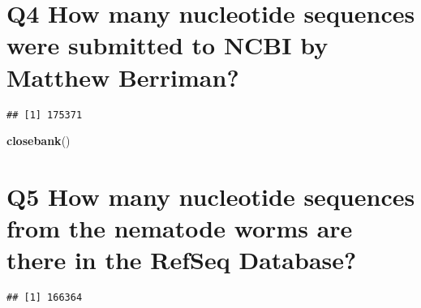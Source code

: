 \documentclass[]{article}
\newenvironment{Shaded}{\begin{snugshade}}{\end{snugshade}}
\newcommand{\KeywordTok}[1]{\textcolor[rgb]{0.13,0.29,0.53}{\textbf{#1}}}
\newcommand{\StringTok}[1]{\textcolor[rgb]{0.31,0.60,0.02}{#1}}
\newcommand{\OperatorTok}[1]{\textcolor[rgb]{0.81,0.36,0.00}{\textbf{#1}}}
\newcommand{\NormalTok}[1]{#1}
\begin{document}
\section{Q4 How many nucleotide sequences were submitted to NCBI by
Matthew
Berriman?}\label{q4-how-many-nucleotide-sequences-were-submitted-to-ncbi-by-matthew-berriman}

\begin{Shaded}
\end{Shaded}

\begin{verbatim}
## [1] 175371
\end{verbatim}

\begin{Shaded}
\begin{Highlighting}[]
\KeywordTok{closebank}\NormalTok{()}
\end{Highlighting}
\end{Shaded}

\section{Q5 How many nucleotide sequences from the nematode worms are
there in the RefSeq
Database?}\label{q5-how-many-nucleotide-sequences-from-the-nematode-worms-are-there-in-the-refseq-database}

\begin{Shaded}
\end{Shaded}

\begin{verbatim}
## [1] 166364
\end{verbatim}
\end{document}
